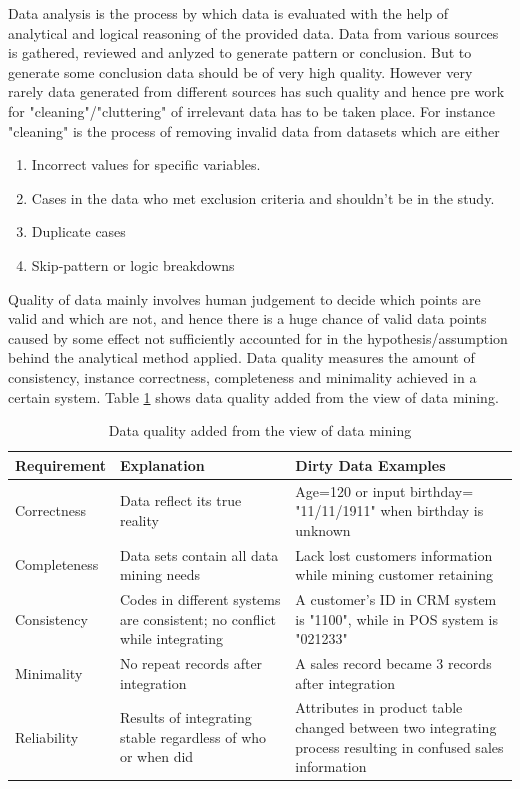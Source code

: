 \documentclass[article,type=msc,colorback,accentcolor=tud9c,twoside,11pt]{tudthesis}
\begin{document}
Data analysis is the process by which data is evaluated with the help of analytical and logical reasoning of the provided data. Data from various sources is gathered, reviewed and anlyzed to generate pattern or conclusion. But to generate some conclusion data should be of very high quality. However very rarely data generated from different sources has such quality and hence pre work for "cleaning"/"cluttering" of irrelevant data has to be taken place. For instance "cleaning" is the process of removing invalid data from datasets which are either
\begin{enumerate}
	\item Incorrect values for specific variables.
	\item Cases in the data who met exclusion criteria and shouldn’t be in the study.
	\item Duplicate cases
	\item Skip-pattern or logic breakdowns
\end{enumerate}
 Quality of data mainly involves human judgement to decide which points are valid and which are not, and hence there is a huge chance of valid data points caused by some effect not sufficiently accounted for in the hypothesis/assumption behind the analytical method applied. Data quality measures the amount of consistency, instance correctness, completeness and minimality achieved in a certain system. Table \ref{DataQuality} \cite{Dataquality} shows data quality added from the view of data mining.

\begin{table}[H]
	\centering
	\begin{tabular}{|p{3cm}|p{5cm}|p{7cm}|}
		\hline
		\textbf{Requirement} & \textbf{Explanation} & \textbf{Dirty Data Examples} 
	\\ \hline
		Correctness   & Data reflect its true reality             & Age=120 or input birthday= "11/11/1911" when birthday is unknown\\ \hline
		
	Completeness   & Data sets contain all data mining needs & Lack lost customers information while mining customer retaining\\ \hline
	
	Consistency  & Codes in different systems are consistent; no conflict while
	integrating  & A customer’s ID in CRM system is "1100", while in POS system is "021233"\\ \hline
	
	Minimality  & No repeat records after integration  &A sales record became 3 records after integration\\ \hline
	
	Reliability  & Results of integrating stable regardless of who or when did  & Attributes in product table changed between two integrating process resulting in confused sales information\\ \hline		
	\end{tabular}
	\caption{Data quality added from the view of data mining}
	\label{DataQuality}
\end{table}
\end{document}
